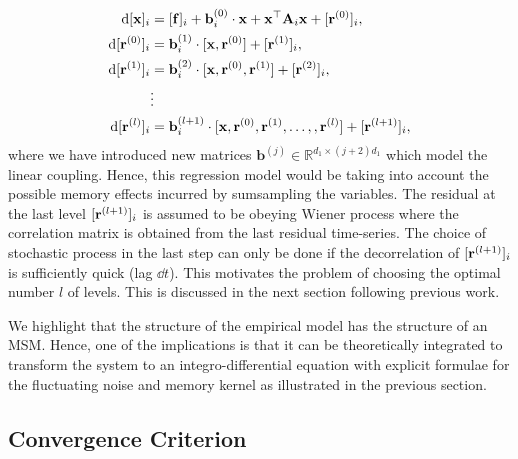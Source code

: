 \documentclass[12pt]{article}
\begin{document}
\begin{align*}
	\mathrm{d} [\mathbf{x}]_i &= [\mathbf{f}]_i + \mathbf{b}_i^{(0)}\cdot \mathbf{x}+ \mathbf{x}^{\top}\mathbf{A}_i\mathbf{x} + [\mathbf{r}^{(0)}]_i, \\
	\mathrm{d} [\mathbf{r}^{(0)}]_i &= \mathbf{b}_i^{(1)}\cdot [\mathbf{x},\mathbf{r}^{(0)}] + [\mathbf{r}^{(1)}]_i, \\
		\mathrm{d} [\mathbf{r}^{(1)}]_i &= \mathbf{b}_i^{(2)}\cdot [\mathbf{x},\mathbf{r}^{(0)},\mathbf{r}^{(1)}] + [\mathbf{r}^{(2)}]_i, \\
	& \vdots \\
		\mathrm{d} [\mathbf{r}^{(l)}]_i &= \mathbf{b}_i^{(l+1)}\cdot [\mathbf{x},\mathbf{r}^{(0)},\mathbf{r}^{(1)},\ldots, ,\mathbf{r}^{(l)}] + [\mathbf{r}^{(l+1)}]_i,
\end{align*}
where we have introduced new matrices $\mathbf{b}^{(j)}\in \mathbb{R}^{d_1 \times (j+2)d_1}$ which model the linear coupling. Hence, this regression model would be taking into account the possible memory effects incurred by sumsampling the variables. The residual at the last level $[\mathbf{r}^{(l+1)}]_i$ is assumed to be obeying Wiener process where the correlation matrix is obtained from the last residual time-series. The choice of stochastic process in the last step can only be done if the decorrelation of $[\mathbf{r}^{(l+1)}]_i$ is sufficiently quick (lag $\dd t$). This motivates the problem of choosing the optimal number $l$ of levels. This is discussed in the next section following previous work.

We highlight that the structure of the empirical model has the structure of an MSM. Hence, one of the implications is that it can be theoretically integrated to transform the system to an integro-differential equation with explicit formulae for the fluctuating noise and memory kernel as illustrated in the previous section.



\subsection*{Convergence Criterion}
\end{document}
